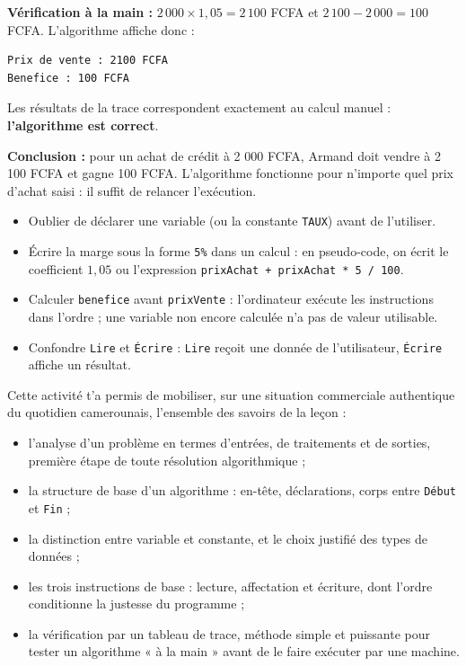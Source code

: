 \documentclass[11pt]{article}
\newcommand{\cle}[1]{{\popxbold\color{popdark}#1}}
\newcounter{popsec}
\newcounter{popsub}
\newcommand{\courssub}[1]{%
  \stepcounter{popsub}%
  \par\vspace{9pt}\noindent{\popxbold\fontsize{11.5}{13}\selectfont\color{popink}{\color{poporange}\thepopsec.\thepopsub}\hspace{6pt}#1}\par\nopagebreak\vspace{4pt}
}
\begin{document}
\begin{exoresolu}
\textbf{Vérification à la main :} $2\,000 \times 1{,}05 = 2\,100$ FCFA et $2\,100 - 2\,000 = 100$ FCFA. L'algorithme affiche donc :

\begin{lstlisting}
Prix de vente : 2100 FCFA
Benefice : 100 FCFA
\end{lstlisting}

Les résultats de la trace correspondent exactement au calcul manuel : \textbf{l'algorithme est correct}.

\textbf{Conclusion :} pour un achat de crédit à 2 000 FCFA, Armand doit vendre à 2 100 FCFA et gagne 100 FCFA. L'algorithme fonctionne pour n'importe quel prix d'achat saisi : il suffit de relancer l'exécution.
\end{exoresolu}

\begin{attention}
\begin{itemize}
\item Oublier de déclarer une variable (ou la constante \texttt{TAUX}) avant de l'utiliser.
\item Écrire la marge sous la forme \texttt{5\%} dans un calcul : en pseudo-code, on écrit le coefficient $1{,}05$ ou l'expression \texttt{prixAchat + prixAchat * 5 / 100}.
\item Calculer \texttt{benefice} avant \texttt{prixVente} : l'ordinateur exécute les instructions \cle{dans l'ordre} ; une variable non encore calculée n'a pas de valeur utilisable.
\item Confondre \texttt{Lire} et \texttt{Écrire} : \texttt{Lire} reçoit une donnée de l'utilisateur, \texttt{Écrire} affiche un résultat.
\end{itemize}
\end{attention}

\courssub{Bilan de l'activité}

Cette activité t'a permis de mobiliser, sur une situation commerciale authentique du quotidien camerounais, l'ensemble des savoirs de la leçon :

\begin{itemize}
\item l'\cle{analyse d'un problème} en termes d'entrées, de traitements et de sorties, première étape de toute résolution algorithmique ;
\item la \cle{structure de base d'un algorithme} : en-tête, déclarations, corps entre \texttt{Début} et \texttt{Fin} ;
\item la distinction entre \cle{variable} et \cle{constante}, et le choix justifié des \cle{types de données} ;
\item les trois \cle{instructions de base} : lecture, affectation et écriture, dont l'ordre conditionne la justesse du programme ;
\item la \cle{vérification par un tableau de trace}, méthode simple et puissante pour tester un algorithme « à la main » avant de le faire exécuter par une machine.
\end{itemize}
\end{document}
